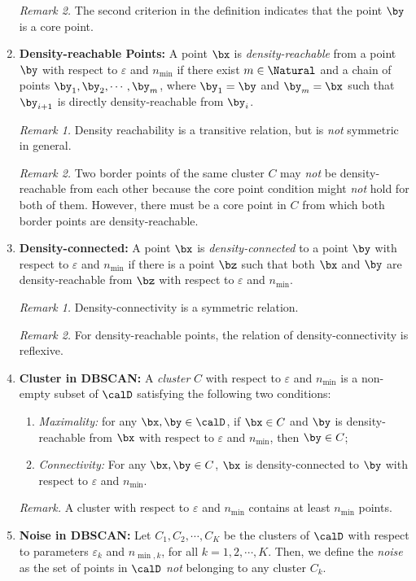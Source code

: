 \documentclass[12pt]{article}
\begin{document}
\begin{enumerate}[label=\textbf{\arabic*.}]
	\textit{Remark 2.} The second criterion in the definition indicates that the point $\by$ is a core point. 
	
	\item \textbf{Density-reachable Points:} A point $\bx$ is \emph{density-reachable} from a point $\by$ with respect to $\varepsilon$ and $n_{\min}$ if there exist $m \in \Natural$ and a chain of points $\by_1, \by_2, \cdots, \by_m$, where $\by_1 = \by$ and $\by_m = \bx$ such that $\by_{i+1}$ is directly density-reachable from $\by_i$. 
	
	\textit{Remark 1.} Density reachability is a transitive relation, but is \emph{not} symmetric in general. 
	
	\textit{Remark 2.} Two border points of the same cluster $C$ may \emph{not} be density-reachable from each other because the core point condition might \emph{not} hold for both of them. However, there must be a core point in $C$ from which both border points are density-reachable. 
	
	\item \textbf{Density-connected:} A point $\bx$ is \emph{density-connected} to a point $\by$ with respect to $\varepsilon$ and $n_{\min}$ if there is a point $\bz$ such that both $\bx$ and $\by$ are density-reachable from $\bz$ with respect to $\varepsilon$ and $n_{\min}$. 
	
	\textit{Remark 1.} Density-connectivity is a symmetric relation. 
	
	\textit{Remark 2.} For density-reachable points, the relation of density-connectivity is reflexive. 
	
	\item \textbf{Cluster in DBSCAN:} A \emph{cluster} $C$ with respect to $\varepsilon$ and $n_{\min}$ is a non-empty subset of $\calD$ satisfying the following two conditions: 
	\begin{enumerate}
		\item \textit{Maximality:} for any $\bx, \by \in \calD$, if $\bx \in C$ and $\by$ is density-reachable from $\bx$ with respect to $\varepsilon$ and $n_{\min}$, then $\by \in C$; 
		\item \textit{Connectivity:} For any $\bx, \by \in C$, $\bx$ is density-connected to $\by$ with respect to $\varepsilon$ and $n_{\min}$. 
	\end{enumerate}
	
	\textit{Remark.} A cluster with respect to $\varepsilon$ and $n_{\min}$ contains at least $n_{\min}$ points. 
	
	\item \textbf{Noise in DBSCAN:} Let $C_1, C_2, \cdots, C_K$ be the clusters of $\calD$ with respect to parameters $\varepsilon_k$ and $n_{\min, k}$, for all $k = 1, 2, \cdots, K$. Then, we define the \emph{noise} as the set of points in $\calD$ \emph{not} belonging to any cluster $C_k$. 
	

\end{enumerate}
\end{document}
